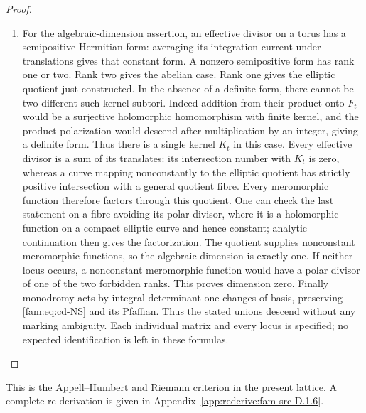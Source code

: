 \begin{proof}
\begin{enumerate}[label=\arabic*.,leftmargin=*]
\item For the algebraic-dimension assertion, an effective divisor on a torus
has a semipositive Hermitian form: averaging its integration current under
translations gives that constant form. A nonzero semipositive form has
rank one or two. Rank two gives the abelian case. Rank one gives the
elliptic quotient just constructed. In the absence of a definite form,
there cannot be two different such kernel subtori. Indeed addition from
their product onto $F_t$ would be a surjective holomorphic homomorphism
with finite kernel, and the product polarization would descend after
multiplication by an integer, giving a definite form. Thus there is a
single kernel $K_t$ in this case. Every effective divisor is a sum of
its translates: its intersection number with $K_t$ is zero, whereas a
curve mapping nonconstantly to the elliptic quotient has strictly positive
intersection with a general quotient fibre. Every meromorphic function
therefore factors through this quotient. One can check the last statement
on a fibre avoiding its polar divisor, where it is a holomorphic function
on a compact elliptic curve and hence constant; analytic continuation
then gives the factorization. The quotient supplies nonconstant
meromorphic functions, so the algebraic dimension is exactly one.
If neither locus occurs, a nonconstant meromorphic function would have
a polar divisor of one of the two forbidden ranks. This proves dimension
zero. Finally monodromy acts by integral determinant-one changes of basis,
preserving \eqref{fam:eq:cd-NS} and its Pfaffian. Thus the stated unions descend
without any marking ambiguity. Each individual matrix and every locus
is specified; no expected identification is left in these formulas.
\end{enumerate}
\end{proof}



This is the Appell--Humbert and Riemann criterion in the present lattice. A complete re-derivation is given in Appendix~\ref{app:rederive:fam-src-D.1.6}.


